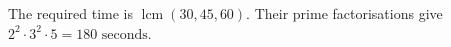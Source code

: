 The required time is $\operatorname{lcm}(30,45,60)$. Their prime factorisations give $2^2\cdot3^2\cdot5=\boxed{180\text{ seconds}}$.
